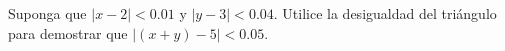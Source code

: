 \item Suponga que $|x - 2| < 0.01$ y $|y - 3| < 0.04$. Utilice la desigualdad del triángulo para demostrar que $|(x + y) - 5| < 0.05$.
